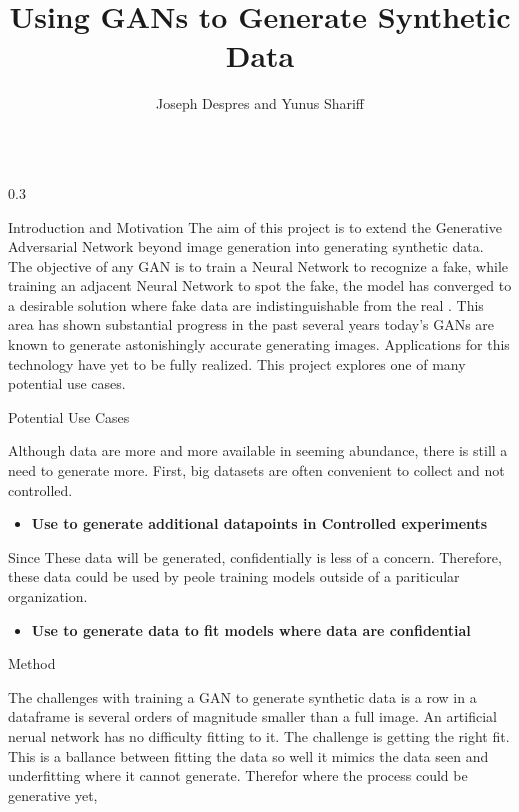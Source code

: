 \documentclass{msuposter}
\title{Using GANs to Generate Synthetic Data}
\author{Joseph Despres and Yunus Shariff}
\institute{Michigan State University}
\newcommand{\colwidth}{0.3\linewidth}
\begin{document}
\begin{frame}{}
\begin{columns}[t]

\begin{column}{\colwidth}

\begin{block}{Introduction and Motivation}
The aim of this project is to extend the Generative Adversarial Network beyond image generation into generating synthetic data. The objective of any GAN is to train a Neural Network to recognize a fake, while training an adjacent Neural Network to spot the fake, the model has converged to a desirable solution where fake data are indistinguishable from the real \cite{NIPS2014_5ca3e9b1}.  This area has shown substantial progress in the past several years today's GANs are known to generate astonishingly accurate generating images. Applications for this technology have yet to be fully realized. This project explores one of many potential use cases.

\end{block}

\begin{block}{Potential Use Cases}

Although data are more and more available in seeming abundance, there is still a need to generate more. First, big datasets are often convenient to collect and not controlled.

\begin{itemize}
	\item \textbf{Use to generate additional datapoints in Controlled experiments}
\end{itemize}

Since These data will be generated, confidentially is less of a concern. Therefore, these data could be used by peole training models outside of a pariticular organization.

\begin{itemize}
	\item \textbf{Use to generate data to fit models where data are confidential}
	
\end{itemize}

\end{block}

\begin{block}{Method}

The challenges with training a GAN to generate synthetic data is a row in a dataframe is several orders of magnitude smaller than a full image. An artificial nerual network has no difficulty fitting to it. The challenge is getting the right fit. This is a ballance between fitting the data so well it mimics the data seen and underfitting where it cannot generate. Therefor  where the process could be generative yet, 


\end{block}
\end{column}
\end{columns}
\end{frame}
\end{document}
